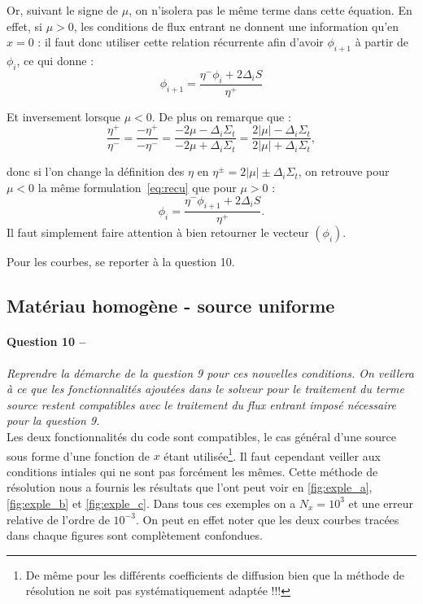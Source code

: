 \documentclass[11pt,a4paper]{article}
\newcommand{\question}[2]{\paragraph{Question #1 --}\hspace{-7pt}\textit{#2} \\}
\begin{document}
Or, suivant le signe de $\mu$, on n'isolera pas le même terme dans cette équation.
En effet, si $\mu>0$, les conditions de flux entrant ne donnent une information qu'en $x=0$ : il faut donc utiliser cette relation récurrente afin d'avoir $\phi_{i+1}$ à partir de $\phi_i$, ce qui donne :
\begin{equation}
 \phi_{i+1} = \frac{\eta^- \phi_i + 2 \Delta_i S}{\eta^+}
 \label{eq:recu}
\end{equation}

Et inversement lorsque $\mu<0$.
De plus on remarque que :
\begin{equation}
 \frac{\eta^+}{\eta^-} = \frac{- \eta^+}{-\eta^-} = \frac{-2 \mu - \Delta_i \Sigma_t}{-2 \mu + \Delta_i \Sigma_t} = \frac{2 |\mu| - \Delta_i \Sigma_t}{2 |\mu| + \Delta_i \Sigma_t} ,
\end{equation}

donc si l'on change la définition des $\eta$ en $\eta^{\pm} = 2|\mu| \pm \Delta_i \Sigma_t$, on retrouve pour $\mu<0$ la même formulation~\ref{eq:recu} que pour $\mu>0$ :
\begin{equation}
 \phi_i = \frac{\eta^- \phi_{i+1} + 2 \Delta_i S}{\eta^+} .
\end{equation}
Il faut simplement faire attention à bien retourner le vecteur $(\phi_i)$.

Pour les courbes, se reporter à la question 10.
\subsection{Matériau homogène - source uniforme}

\question{10}{Reprendre la démarche de la question 9 pour ces nouvelles conditions. On veillera à ce que les fonctionnalités
 ajoutées dans le solveur pour le traitement du terme source restent compatibles avec le traitement du flux entrant imposé nécessaire pour la question 9.}

Les deux fonctionnalités du code sont compatibles, le cas général d'une source sous forme d'une fonction de $x$ étant utilisée\footnote{De même pour les différents coefficients de diffusion bien que la méthode de résolution ne soit pas systématiquement adaptée !!!}. Il faut cependant veiller aux conditions intiales qui ne sont pas forcément les mêmes. Cette méthode de résolution nous a fournis les résultats que l'ont peut voir en \autoref{fig:exple_a}, \autoref{fig:exple_b} et \autoref{fig:exple_c}. Dans tous ces exemples on a $N_x=10^{3}$ et une erreur relative de l'ordre de $10^{-3}$. On peut en effet noter que les deux courbes tracées dans chaque figures sont complètement confondues. 
\end{document}
